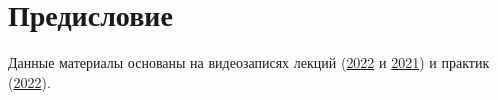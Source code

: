 \section*{Предисловие}

Данные материалы основаны на видеозаписях лекций
(\href{https://www.youtube.com/watch?v=otErwbHi6sk&list=PLd7QXkfmSY7ZOTP3bhPT3jGoIlXql8kkX}{2022}
и \href{https://www.youtube.com/watch?v=7VYhJkOeMUI&list=PLd7QXkfmSY7Z8jlnTMIpUy2fteJgY6u3q}{2021})
и практик (\href{https://www.youtube.com/watch?v=126gMswoCPY&list=PLd7QXkfmSY7b1EikiroQt_HQy-ZcrurQE}{2022}).
